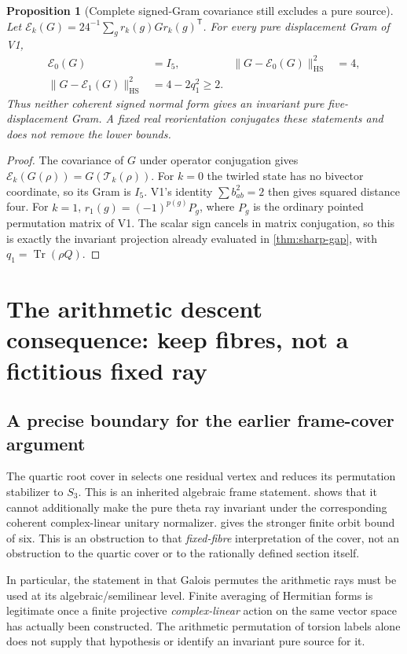 \documentclass[11pt]{article}
\newtheorem{proposition}[proposition]{Proposition}
\theoremstyle{definition}
\theoremstyle{remark}
\newcommand{\Tr}{\operatorname{Tr}}
\newcommand{\HS}{\mathrm{HS}}
\newcommand{\norm}[1]{\lVert#1\rVert}
\begin{document}
\begin{proposition}[Complete signed-Gram covariance still excludes a pure source]
\label{prop:v2-Gram-gap}
Let $\mathcal E_k(G)=24^{-1}\sum_g r_k(g)G r_k(g)^{\mathsf T}$.
For every pure displacement Gram of V1,
\begin{align}
 \mathcal E_0(G)&=I_5,&
 \norm{G-\mathcal E_0(G)}_{\HS}^2&=4,\\
 \norm{G-\mathcal E_1(G)}_{\HS}^2&=4-2q_1^2\ge2.
 \label{eq:v2-signed-Gram-gaps}
\end{align}
Thus neither coherent signed normal form gives an invariant pure
five-displacement Gram. A fixed real reorientation conjugates these
statements and does not remove the lower bounds.
\end{proposition}
\begin{proof}
The covariance of $G$ under operator conjugation gives
$\mathcal E_k(G(\rho))=G(\mathcal T_k(\rho))$.
For $k=0$ the twirled state has no bivector coordinate, so its Gram is $I_5$.
V1's identity $\sum b_{ab}^2=2$ then gives squared distance four.
For $k=1$, $r_1(g)=(-1)^{p(g)}P_g$, where $P_g$ is the ordinary pointed
permutation matrix of V1. The scalar sign cancels in matrix conjugation,
so this is exactly the invariant projection already evaluated in
\cref{thm:sharp-gap}, with $q_1=\Tr(\rho Q)$.
\end{proof}

\section{The arithmetic descent consequence: keep fibres, not a fictitious fixed ray}
\label{sec:v2-descent}

\subsection{A precise boundary for the earlier frame-cover argument}
The quartic root cover in \cite{AD9} selects one residual vertex and reduces
its permutation stabilizer to $S_3$. This is an inherited algebraic frame
statement.  shows that it cannot additionally make the
pure theta ray invariant under the corresponding coherent complex-linear
unitary normalizer.  gives the stronger finite orbit
bound of six. This is an obstruction to that \emph{fixed-fibre}
interpretation of the cover, not an obstruction to the quartic cover or to
the rationally defined section itself.

In particular, the statement in
 that Galois permutes the
arithmetic rays must be used at its algebraic/semilinear level. Finite
averaging of Hermitian forms is legitimate once a finite projective
\emph{complex-linear} action on the same vector space has actually been
constructed. The arithmetic permutation of torsion labels alone does not
supply that hypothesis or identify an invariant pure source for it.
\end{document}
